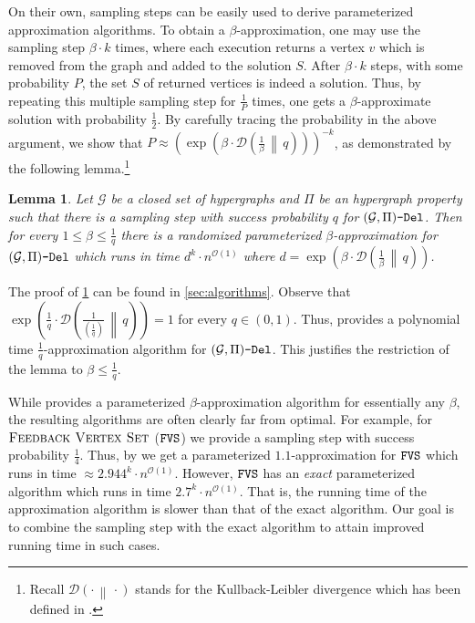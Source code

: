 \documentclass[letterpaper,11pt]{article}
\newcommand{\1}[1]{\mathds{1}\left[#1\right]}
\newcommand{\D}[2]{\mathcal{D}\left(#1\, \middle\|\,#2 \right)}
\newcommand{\Oh}{\mathcal{O}}
\newtheorem{lemma}[theorem]{Lemma}
\newcommand{\sgpivd}[1][\mathcal{G},\Pi]{(#1)\textnormal{\texttt{-Del}}}
\newcommand{\FVS}{\textnormal{\texttt{FVS}}\xspace}
\newcommand{\fvs}{\textsc{Feedback Vertex Set}\xspace}
\begin{document}
On their own, sampling steps can be easily used to derive parameterized approximation algorithms. To obtain a $\beta$-approximation, one may use the sampling step $\beta\cdot k$ times, where each execution returns a vertex $v$ which is removed from the graph and added to the solution $S$. After $\beta\cdot k$ steps, with some probability $P$, the set $S$ of returned vertices is indeed a solution. Thus, by repeating this multiple sampling step for  $\frac{1}{P}$ times, one gets a $\beta$-approximate solution with probability $\frac{1}{2}$. 
By carefully tracing the probability in the above argument, we show that $P\approx \left(\exp\left(\beta \cdot \D{\frac{1}{\beta}}{q}\right) \right)^{-k}$, as demonstrated by the following lemma.\footnote{Recall $\D{\cdot}{\cdot}$ stands for  the Kullback-Leibler divergence which has been defined in .} 

\begin{lemma}
\label{lem:sampling_to_approximation}
Let  $\mathcal{G}$ be a closed  set of hypergraphs  and $\Pi$ be an hypergraph property such that there is a sampling step with success probability $q$ for $\sgpivd$. Then for every $1\leq \beta \leq \frac{1}{q}$ there is a randomized parameterized $\beta$-approximation for $\sgpivd$ which runs in time $d^{k}\cdot n^{\Oh(1)}$ where  $d=\exp\left(\beta\cdot \D{\frac{1}{\beta}}{q}\right) $.
\end{lemma}

The proof of \cref{lem:sampling_to_approximation} can be found in \cref{sec:algorithms}.
Observe that  $\exp\left(\frac{1}{q}\cdot \D{\frac{1}{\left(\frac{1}{q}\right)}}{q}\right)= 1$ for every $q\in (0,1)$. Thus,  provides a polynomial time $\frac{1}{q}$-approximation algorithm for $\sgpivd$. This justifies the restriction of the lemma to $\beta\leq \frac{1}{q}$.

While   provides a parameterized $\beta$-approximation algorithm for essentially any $\beta$, the resulting algorithms are often clearly far from optimal. For example, for $\fvs$ ($\FVS$) we provide a sampling step with success probability $\frac{1}{4}$.
Thus, by  we get a  parameterized $1.1$-approximation for $\FVS$ which runs in time $\approx 2.944^k \cdot n^{\Oh(1)}$. However, $\FVS$ has an {\em exact} parameterized algorithm which runs in time $2.7^k\cdot n^{\Oh(1)}$. That is, the running time of the approximation algorithm is slower than that of the exact algorithm. Our goal is to combine the sampling step with the exact algorithm to attain improved running time in such cases. 
 
\end{document}

